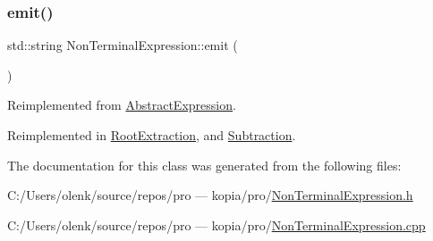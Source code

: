 \mbox{\label{class_non_terminal_expression_affcc5d6e649552b3788661ec9663eb63}} 
\subsubsection{\texorpdfstring{emit()}{emit()}}
{\footnotesize\ttfamily std\+::string Non\+Terminal\+Expression\+::emit (\begin{DoxyParamCaption}{ }\end{DoxyParamCaption})\hspace{0.3cm}{\ttfamily [virtual]}}



Reimplemented from \mbox{\hyperlink{class_abstract_expression_a9f19c05e663491688cdf4423e002a391}{Abstract\+Expression}}.



Reimplemented in \mbox{\hyperlink{class_root_extraction_a56d0e41c6864824111928192345419d0}{Root\+Extraction}}, and \mbox{\hyperlink{class_subtraction_a5371fb13392abe0c2b9fb05ca8bc7875}{Subtraction}}.



The documentation for this class was generated from the following files\+:\begin{DoxyCompactItemize}
\item 
C\+:/\+Users/olenk/source/repos/pro — kopia/pro/\mbox{\hyperlink{_non_terminal_expression_8h}{Non\+Terminal\+Expression.\+h}}\item 
C\+:/\+Users/olenk/source/repos/pro — kopia/pro/\mbox{\hyperlink{_non_terminal_expression_8cpp}{Non\+Terminal\+Expression.\+cpp}}\end{DoxyCompactItemize}
